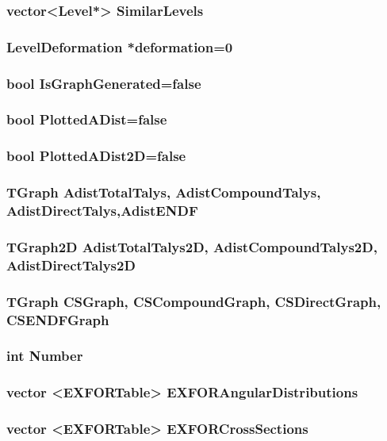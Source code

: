 \documentclass[a4paper,12pt]{extarticle}
\begin{document}
\subsubsection{vector<Level*> SimilarLevels}

\subsubsection{LevelDeformation *deformation=0}

\subsubsection{bool IsGraphGenerated=false}

\subsubsection{bool PlottedADist=false}

\subsubsection{bool PlottedADist2D=false}

\subsubsection{TGraph AdistTotalTalys, AdistCompoundTalys, AdistDirectTalys,AdistENDF}

\subsubsection{TGraph2D AdistTotalTalys2D, AdistCompoundTalys2D, AdistDirectTalys2D}

\subsubsection{TGraph CSGraph, CSCompoundGraph, CSDirectGraph, CSENDFGraph}

\subsubsection{int Number}

\subsubsection{vector <EXFORTable> EXFORAngularDistributions}

\subsubsection{vector <EXFORTable> EXFORCrossSections}
\end{document}
